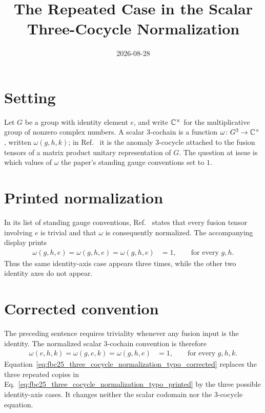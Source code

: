 \documentclass{article}
\title{The Repeated Case in the Scalar Three-Cocycle Normalization}
\author{}
\date{2026-08-28}
\begin{document}
\maketitle
{}

\section{Setting}

Let $G$ be a group with identity element $e$, and write $\mathbb{C}^\times$ for the
multiplicative group of nonzero complex numbers. A scalar $3$-cochain is a
function $\omega\colon G^3\to\mathbb{C}^\times$, written $\omega(g,h,k)$; in
Ref.~\cite{FrancoRubio2025MPUGauging} it is the anomaly $3$-cocycle attached
to the fusion tensors of a matrix product unitary representation of $G$. The
question at issue is which values of $\omega$ the paper's standing gauge
conventions set to $1$.

\section{Printed normalization}

In its list of standing gauge conventions,
Ref.~\cite{FrancoRubio2025MPUGauging} states that every fusion tensor
involving $e$ is trivial and that $\omega$ is consequently normalized. The
accompanying display prints
\begin{align}
    \omega(g,h,e)=\omega(g,h,e)=\omega(g,h,e)
        &=1,
        \qquad \text{for every }g,h.
    \label{eq:fbc25_three_cocycle_normalization_typo_printed}
\end{align}
Thus the same identity-axis case appears three times, while the other two
identity axes do not appear.

\section{Corrected convention}

The preceding sentence requires triviality whenever any fusion input is the
identity. The normalized scalar $3$-cochain convention is therefore
\begin{align}
    \omega(e,h,k)=\omega(g,e,k)=\omega(g,h,e)
        &=1,
        \qquad \text{for every }g,h,k.
    \label{eq:fbc25_three_cocycle_normalization_typo_corrected}
\end{align}
Equation~\ref{eq:fbc25_three_cocycle_normalization_typo_corrected} replaces the
three repeated copies in
Eq.~\ref{eq:fbc25_three_cocycle_normalization_typo_printed} by the three
possible identity-axis cases. It changes neither the scalar codomain nor the
$3$-cocycle equation.
\end{document}
